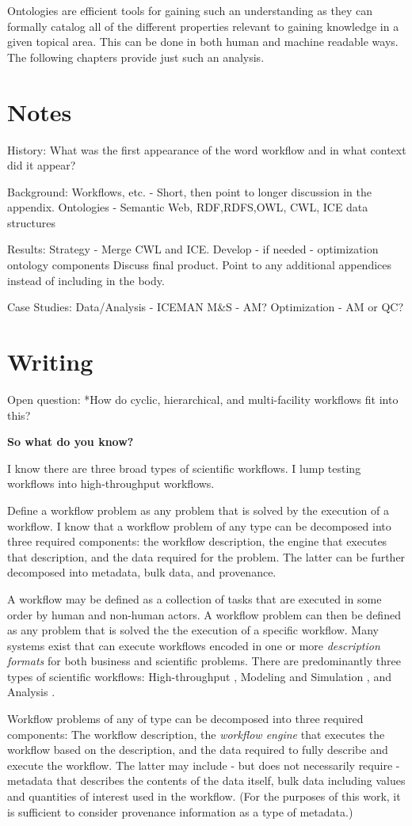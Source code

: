 Ontologies are efficient tools for gaining such an understanding as they
can formally catalog all of the different properties relevant to gaining
knowledge in a given topical area. This can be done in both human and machine
readable ways. The following chapters provide just such an analysis.

\section{Notes}

History:
What was the first appearance of the word workflow and in what context did it
appear?

Background:
Workflows, etc. - Short, then point to longer discussion in the appendix.
Ontologies - Semantic Web, {RDF,RDFS,OWL}, CWL, ICE data structures

Results:
Strategy - Merge CWL and ICE. Develop - if needed - optimization ontology components
Discuss final product. Point to any additional appendices instead of including in the body.

Case Studies:
Data/Analysis - ICEMAN
M\&S - AM?
Optimization - AM or QC?

\section{Writing}

Open question:
*How do cyclic, hierarchical, and multi-facility workflows fit into this?

\textbf{So what do you know?}

I know there are three broad types of scientific workflows. I lump testing
workflows into high-throughput workflows.

Define a workflow problem as any problem that is solved by the execution of a
workflow. I know that a workflow problem of any type can be decomposed into
three required components: the workflow description, the engine that executes
that description, and the data required for the problem. The latter can be
further decomposed into metadata, bulk data, and provenance.

A workflow may be defined as a collection of tasks that are executed in some
order by human and non-human actors. A workflow problem can then be defined as
any problem that is solved the the execution of a specific workflow. Many
systems exist that can execute workflows encoded in one or more
\textit{description formats} for both business and scientific problems. There
are predominantly three types of scientific workflows: High-throughput \cite{},
Modeling and Simulation \cite{}, and Analysis \cite{}.

Workflow problems of any of type can be decomposed into three required
components: The workflow description, the \textit{workflow engine} that
executes the workflow based on the description, and the data required to fully
describe and execute the workflow. The latter may include - but does not
necessarily require - metadata that describes the contents of the data itself,
bulk data including values and quantities of interest used in the workflow.
(For the purposes of this work, it is sufficient to consider provenance
information as a type of metadata.)
